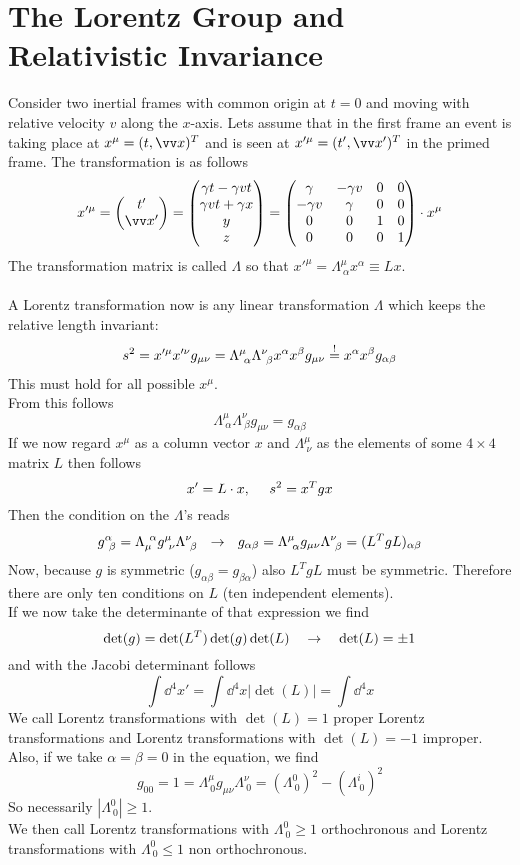\section{The Lorentz Group and Relativistic Invariance}
Consider two inertial frames with common origin at $t = 0$ and moving with relative velocity $v$ along the $x$-axis. Lets assume that in the first frame an event is taking place at $x^\mu = (t, \vx)^T$ and is seen at $x'^\mu = (t', \vx')^T$ in the primed frame. The transformation is as follows
\[ x'^\mu = \vektorz{t'}{\vx'} = \begin{pmatrix} \gamma t - \gamma v t \\  \gamma v t + \gamma x\\ y \\z\end{pmatrix} = \begin{pmatrix} \gamma & - \gamma v & 0 & 0 \\ -\gamma v & \gamma & 0 & 0 \\ 0 & 0 & 1 & 0 \\ 0 & 0 & 0 & 1\end{pmatrix}\cc x^\mu\]
The transformation matrix is called $\Lambda$ so that $x'^\mu = \Lambda^\mu_{~\alpha} x^\alpha \equiv L x$.\\
\\A Lorentz transformation now is any linear transformation $\Lambda$ which keeps the relative length invariant:
\[ s^2 = x'^\mu x'^\nu g_{\mu\nu} = \Lambda^\mu_{~\alpha} \Lambda^\nu_{~\beta}x^\alpha x^\beta g_{\mu\nu}\overset{!}{=} x^\alpha x^\beta g_{\alpha\beta}\]
This must hold for all possible $x^\mu$.\\
From this follows
\[ \Lambda^\mu_{~\alpha} \Lambda^\nu_{~\beta} g_{\mu\nu} = g_{\alpha\beta}\]
If we now regard $x^\mu$ as a column vector $x$ and $\Lambda^\mu_{~\nu}$ as the elements of some $4\times 4$ matrix $L$ then follows
\[x' = L \cdot x, ~~~~ s^2 = x^Tg x\]
Then the condition on the $\Lambda$'s reads
\[g^\alpha_{~\beta} = \Lambda_\mu^{~\alpha} g^\mu_{~\nu} \Lambda^\nu_{~\beta}~~\rightarrow~~ g_{\alpha\beta} = \Lambda^\mu_{~\alpha} g_{\mu\nu}\Lambda^\nu_{~\beta} = (L^TgL)_{\alpha\beta}\]
Now, because $g$ is symmetric ($g_{\alpha\beta} = g_{\beta\alpha}$) also $L^TgL$ must be symmetric. Therefore there are only ten conditions on $L$ (ten independent elements).\\
If we now take the determinante of that expression we find
\[\det(g) = \det(L^T)\det(g) \det(L)~~~\rightarrow~~~ \det(L) = \pm 1\]
and with the Jacobi determinant follows
\[ \int \dd ^4 x' = \int \dd ^4 x| \det(L) | = \int \dd ^4 x\]
We call Lorentz transformations with $\det(L) = 1$ proper Lorentz transformations and Lorentz transformations with $\det(L) = -1$ improper.\\
Also, if we take $\alpha = \beta = 0$ in the equation, we find 
\[g_{00} = 1 = \Lambda^{\mu}_{~0} g_{\mu\nu} \Lambda^\nu_{~0} = (\Lambda^0_{~0})^2 - (\Lambda^i_{~0})^2\]
So necessarily $|\Lambda^0_{~0}| \geq 1$.\\
We then call Lorentz transformations with $\Lambda^0_{~0} \geq 1$ orthochronous and Lorentz transformations with $\Lambda^0_{~0} \leq 1$ non orthochronous.

